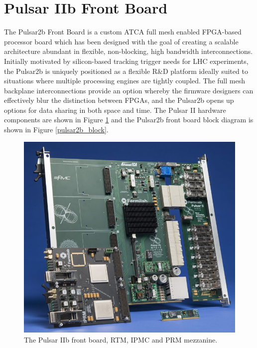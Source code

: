 \documentclass[letterpaper]{article}
\begin{document}

\section{Pulsar IIb Front Board}

The Pulsar2b Front Board is a custom ATCA full mesh enabled FPGA-based processor board which has been designed with the goal of creating a scalable architecture abundant in flexible, non-blocking, high bandwidth interconnections.  Initially motivated by silicon-based tracking trigger needs for LHC experiments, the Pulsar2b is uniquely positioned as a flexible R\&D platform ideally suited to situations where multiple processing engines are tightly coupled.  The full mesh backplane interconnections provide an option whereby the firmware designers can effectively blur the distinction between FPGAs, and the Pulsar2b opens up options for data sharing in both space and time.  The Pulsar II hardware components are shown in Figure \ref{pulsar2} and the Pulsar2b front board block diagram is shown in Figure \ref{pulsar2b_block}.

\begin{figure}
\centering
\includegraphics[width=12cm]{pulsar2.jpg}
\caption{The Pulsar IIb front board, RTM, IPMC and PRM mezzanine.}
\label{pulsar2}
\end{figure}
\end{document}
